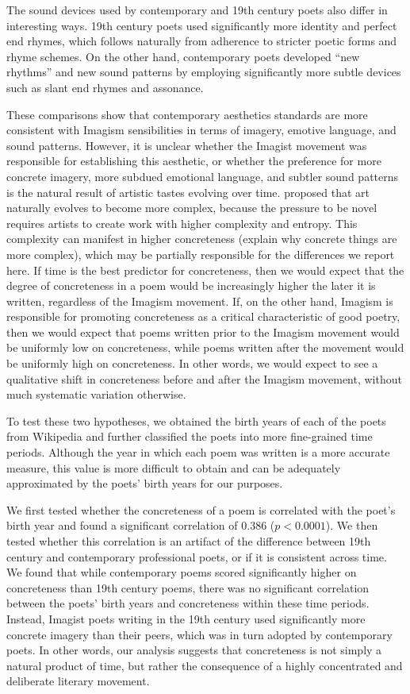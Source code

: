 \documentclass{book}
\begin{document}
The sound devices used by contemporary and 19th century poets also differ in interesting ways. 19th century poets used significantly more identity and perfect end rhymes, which follows naturally from adherence to stricter poetic forms and rhyme schemes. On the other hand, contemporary poets developed ``new rhythms'' and new sound patterns by employing significantly more subtle devices such as slant end rhymes and assonance.

These comparisons show that contemporary aesthetics standards are more consistent with Imagism sensibilities in terms of imagery, emotive language, and sound patterns. However, it is unclear whether the Imagist movement was responsible for establishing this aesthetic, or whether the preference for more concrete imagery, more subdued emotional language, and subtler sound patterns is the natural result of artistic tastes evolving over time. \cite{martindale1990clockwork} proposed that art naturally evolves to become more complex, because the pressure to be novel requires artists to create work with higher complexity and entropy. %
This complexity can manifest in higher concreteness (explain why concrete things are more complex), which may be partially responsible for the differences we report here. If time is the best predictor for concreteness, then we would expect that the degree of concreteness in a poem would be increasingly higher the later it is written, regardless of the Imagism movement. If, on the other hand, Imagism is responsible for promoting concreteness as a critical characteristic of good poetry, then we would expect that poems written prior to the Imagism movement would be uniformly low on concreteness, while poems written after the movement would be uniformly high on concreteness. In other words, we would expect to see a qualitative shift in concreteness before and after the Imagism movement, without much systematic variation otherwise.

To test these two hypotheses, we obtained the birth years of each of the poets from Wikipedia and further classified the poets into more fine-grained time periods. Although the year in which each poem was written is a more accurate measure, this value is more difficult to obtain and can be adequately approximated by the poets' birth years for our purposes.

We first tested whether the concreteness of a poem is correlated with the poet's birth year and found a significant correlation of $0.386$ ($p < 0.0001$). We then tested whether this correlation is an artifact of the difference between 19th century and contemporary professional poets, or if it is consistent across time. We found that while contemporary poems scored significantly higher on concreteness than 19th century poems, there was no significant correlation between the poets' birth years and concreteness within these time periods. Instead, Imagist poets writing in the 19th century used significantly more concrete imagery than their peers, which was in turn adopted by contemporary poets. In other words, our analysis suggests that concreteness is not simply a natural product of time, but rather the consequence of a highly concentrated and deliberate literary movement.
\end{document}
